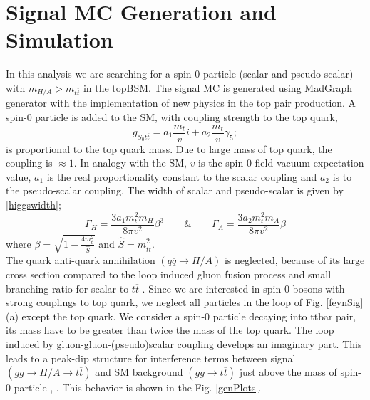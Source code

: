 \documentclass{cmspaper}
\begin{document}
\section{Signal MC Generation and Simulation} 
In this analysis we are searching for a spin-0 particle (scalar and pseudo-scalar) with $m_{H/A} > m_{t\overline{t}}$ in the topBSM. The signal MC is generated using MadGraph \cite{madgraph} generator with the implementation of new physics in the top pair production. A spin-0 particle is added to the SM, with coupling strength to the top quark,
\begin{equation}\label{signalEqu}
g_{S_{0}t\overline{t}} = a_{1}\frac{m_{t}}{v}i + a_{2}\frac{m_{t}}{v}\gamma_{5};
\end{equation} 
is proportional to the top quark mass. Due to large mass of top quark, the coupling is $\approx 1$. In analogy with the SM, $v$ is the spin-0 field vacuum expectation value, $a_{1}$ is the real proportionality constant to the scalar coupling and $a_{2}$ is to the pseudo-scalar coupling. The width of scalar and pseudo-scalar is given by \ref{higgswidth}; 
\begin{equation}\label{higgswidth}
\Gamma_{H} = \frac{3a_{1}m_{t}^{2}m_{H}}{8\pi v^{2}}\beta^{3} \qquad\& \qquad \Gamma_{A} = \frac{3a_{2}m_{t}^{2}m_{A}}{8\pi v^{2}}\beta
\end{equation}
where $\beta = \sqrt{1-\frac{4m_{t}^{2}}{\hat{S}}}$ and $\hat{S} = m_{t\overline{t}}^{2}$.\\
The quark anti-quark annihilation $( q\overline{q}\rightarrow H/A )$ is neglected, because of its large cross section compared to the loop induced gluon fusion process and small branching ratio for scalar to $t\overline{t}$ \cite{signal1}.
Since we are interested in spin-0 bosons with strong couplings to top quark, we neglect all particles in the loop of Fig. \ref{feynSig}(a) except the top quark. We consider a spin-0 particle decaying into ttbar pair, its mass have to be greater than twice the mass of the top quark. The loop induced by gluon-gluon-(pseudo)scalar coupling develops an imaginary part. This leads to a peak-dip structure for interference terms between signal $( gg \rightarrow H/A \rightarrow t\overline{t} )$ and SM background $( gg \rightarrow t\overline{t} )$ just above the mass of spin-0 particle \cite{signal2}, \cite{signal3}.  This behavior is shown in the Fig. \ref{genPlots}.\\
\end{document}
